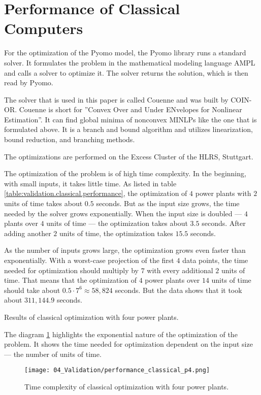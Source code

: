 \section{Performance of Classical Computers}

For the optimization of the Pyomo model, the Pyomo library runs a standard solver.
It formulates the problem in the mathematical modeling language AMPL
and calls a solver to optimize it.
The solver returns the solution, which is then read by Pyomo.
\cite{PyomoAMPL}

The solver that is used in this paper is called Couenne and was built by COIN-OR.
Couenne is short for ''Convex Over and Under ENvelopes for Nonlinear Estimation''.
It can find global minima of nonconvex MINLPs like the one that is formulated above.
It is a branch and bound algorithm and utilizes linearization, bound reduction, and branching methods.
\cite{CoinorHome,CouenneRepo}

The optimizations are performed on the Excess Cluster of the HLRS, Stuttgart.
\cite{ExcessHLRS,HLRS}

The optimization of the problem is of high time complexity.
In the beginning, with small inputs, it takes little time.
As listed in table \ref{table:validation.classical.performance}, the optimization of $4$ power plants with $2$ units of time takes about $0.5$ seconds.
But as the input size grows, the time needed by the solver grows exponentially.
When the input size is doubled --- $4$ plants over $4$ units of time --- the optimization takes about $3.5$ seconds.
After adding another $2$ units of time, the optimization takes $15.5$ seconds.

As the number of inputs grows large, the optimization grows even faster than exponentially.
With a worst-case projection of the first $4$ data points, the time needed for optimization should multiply by $7$ with every additional $2$ units of time.
That means that the optimization of $4$ power plants over $14$ units of time should take about $0.5 \cdot 7^6 \approx 58,824$ seconds.
But the data shows that it took about $311,144.9$ seconds.

\begin{table}[ht]
  \centering
  
  \caption{Results of classical optimization with four power plants.}
  \label{table:validation.classical.performance}
\end{table}

The diagram \ref{figure:validation.classical.performance} highlights the exponential nature of the optimization of the problem.
It shows the time needed for optimization dependent on the input size --- the number of units of time.

\begin{figure}[ht]
  \centering
  \texttt{[image: 04\_Validation/performance\_classical\_p4.png]}
  \caption{Time complexity of classical optimization with four power plants.}
  \label{figure:validation.classical.performance}
\end{figure}
